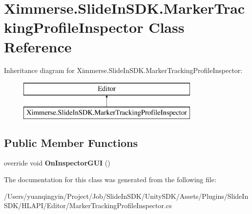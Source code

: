 \hypertarget{class_ximmerse_1_1_slide_in_s_d_k_1_1_marker_tracking_profile_inspector}{}\section{Ximmerse.\+Slide\+In\+S\+D\+K.\+Marker\+Tracking\+Profile\+Inspector Class Reference}
\label{class_ximmerse_1_1_slide_in_s_d_k_1_1_marker_tracking_profile_inspector}
Inheritance diagram for Ximmerse.\+Slide\+In\+S\+D\+K.\+Marker\+Tracking\+Profile\+Inspector\+:\begin{figure}[H]
\begin{center}
\leavevmode
\includegraphics[height=2.000000cm]{class_ximmerse_1_1_slide_in_s_d_k_1_1_marker_tracking_profile_inspector}
\end{center}
\end{figure}
\subsection*{Public Member Functions}
\begin{DoxyCompactItemize}
\item 
\mbox{\label{class_ximmerse_1_1_slide_in_s_d_k_1_1_marker_tracking_profile_inspector_a3508996d99138b1a6369a7d03ab461a3}} 
override void {\bfseries On\+Inspector\+G\+UI} ()
\end{DoxyCompactItemize}


The documentation for this class was generated from the following file\+:\begin{DoxyCompactItemize}
\item 
/\+Users/yuanqingyin/\+Project/\+Job/\+Slide\+In\+S\+D\+K/\+Unity\+S\+D\+K/\+Assets/\+Plugins/\+Slide\+In\+S\+D\+K/\+H\+L\+A\+P\+I/\+Editor/Marker\+Tracking\+Profile\+Inspector.\+cs\end{DoxyCompactItemize}
